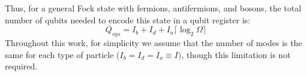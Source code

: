 Thus, for a general Fock state with fermions, antifermions, and bosons, the total number of qubits needed to encode this state in a qubit register is:
\begin{equation}
    Q_{sys} = I_b + I_d + I_a \lceil \log_2{\Omega} \rceil
\end{equation}
Throughout this work, for simplicity we assume that the number of modes is the same for each type of particle ($I_b = I_d = I_a \equiv I)$, though this limitation is not required.


